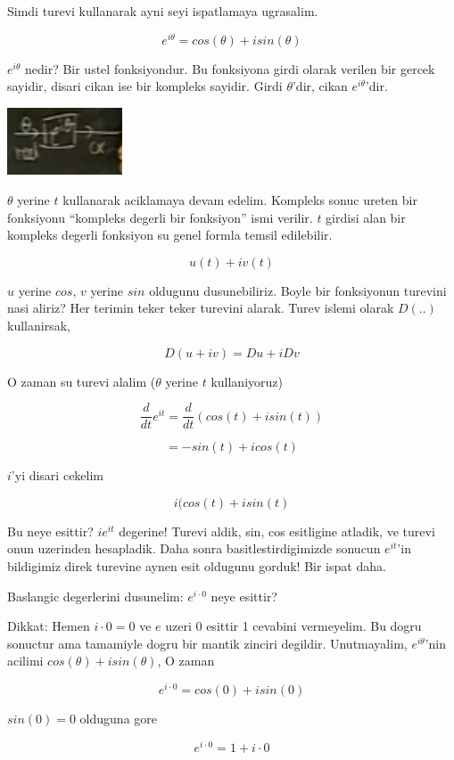 \documentclass[12pt,fleqn]{article}
\begin{document}
Simdi turevi kullanarak ayni seyi ispatlamaya ugrasalim. 

\[ e^{i\theta} = cos(\theta) + isin(\theta) \]

$e^{i\theta}$ nedir? Bir ustel fonksiyondur. Bu fonksiyona girdi olarak
verilen bir gercek sayidir, disari cikan ise bir kompleks sayidir. Girdi
$\theta$'dir, cikan $e^{i\theta}$'dir.

\includegraphics[height=2cm]{6_3.png}

$\theta$ yerine $t$ kullanarak aciklamaya devam edelim. Kompleks sonuc
ureten bir fonksiyonu ``kompleks degerli bir fonksiyon'' ismi verilir. $t$
girdisi alan bir kompleks degerli fonksiyon su genel formla temsil
edilebilir. 

\[ u(t) + iv(t) \]

$u$ yerine $cos$, $v$ yerine $sin$ oldugunu dusunebiliriz. Boyle bir
fonksiyonun turevini nasi aliriz? Her terimin teker teker turevini
alarak. Turev islemi olarak $D(..)$ kullanirsak,

\[ D(u+iv) = Du + iDv \]

O zaman su turevi alalim ($\theta$ yerine $t$ kullaniyoruz) 

\[ \frac{d}{dt}e^{it} = \frac{d}{dt}(cos(t) + isin(t)) \]

\[ = -sin(t) + icos(t) \]

$i$'yi disari cekelim

\[ i(cos(t) + isin(t) \]

Bu neye esittir? $ie^{it}$ degerine! Turevi aldik, sin, cos esitligine
atladik, ve turevi onun uzerinden hesapladik. Daha sonra
basitlestirdigimizde sonucun $e^{it}$'in bildigimiz direk turevine aynen
esit oldugunu gorduk! Bir ispat daha. 

Baslangic degerlerini dusunelim: $e^{i\cdot 0}$ neye esittir? 

Dikkat: Hemen $i \cdot 0 = 0$ ve $e$ uzeri $0$ esittir 1 cevabini
vermeyelim. Bu dogru sonuctur ama tamamiyle dogru bir mantik zinciri
degildir. Unutmayalim, $e^{i\theta}$'nin acilimi $cos(\theta) +
isin(\theta)$, O zaman

\[ e^{i \cdot 0} = cos(0) + isin(0) \]

$sin(0) = 0$ olduguna gore

\[ e^{i \cdot 0} = 1 + i \cdot 0 \]
\end{document}
